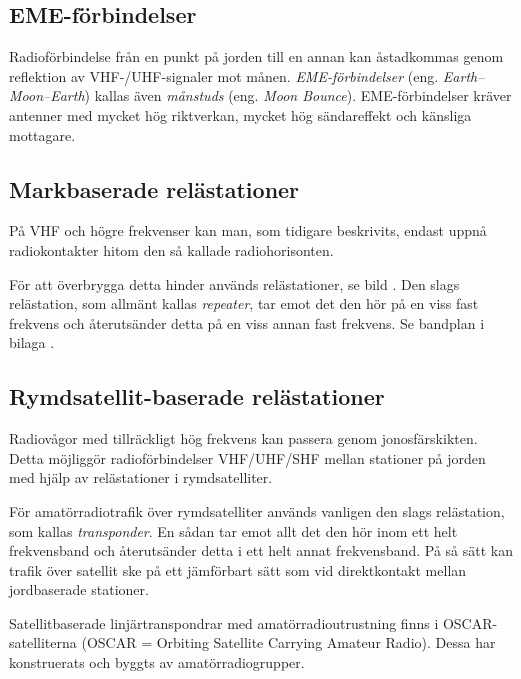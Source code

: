 \subsection{EME-förbindelser}

Radioförbindelse från en punkt på jorden till en annan kan åstadkommas
genom reflektion av VHF-/UHF-signaler mot månen.
\emph{EME-förbindelser} (eng. \emph{Earth--Moon--Earth}) kallas även
\emph{månstuds} (eng. \emph{Moon Bou\-n\-ce}).
EME-förbindelser kräver antenner med mycket hög riktverkan, mycket hög
sändareffekt och känsliga mottagare.

\newpage
\subsection{Markbaserade relästationer}


På VHF och högre frekvenser kan man, som tidigare beskrivits, endast
uppnå radiokontakter hitom den så kallade radiohorisonten.

För att överbrygga detta hinder används relästationer, se bild
.
Den slags relästation, som allmänt kallas \emph{repeater}, tar emot det den hör
på en viss fast frekvens och återutsänder detta på en viss annan fast frekvens.
Se bandplan i bilaga .

\subsection{Rymdsatellit-baserade relästationer}

Radiovågor med tillräckligt hög frekvens kan passera genom jonosfärskikten.
Detta möjliggör radioförbindelser VHF/UHF/SHF mellan
stationer på jorden med hjälp av relästationer i rymdsatelliter.

För amatörradiotrafik över rymdsatelliter används vanligen den slags
relästation, som kallas \emph{transponder}.
En sådan tar emot allt det den hör inom ett helt frekvensband och återutsänder
detta i ett helt annat frekvensband.
På så sätt kan trafik över satellit ske på ett jämförbart sätt som vid
direktkontakt mellan jordbaserade stationer.

Satellitbaserade linjärtranspondrar med amatörradioutrustning finns i
OSCAR-satelliterna (OSCAR = Orbiting Satellite Carrying Amateur Radio).
Dessa har konstruerats och byggts av amatörradiogrupper.

